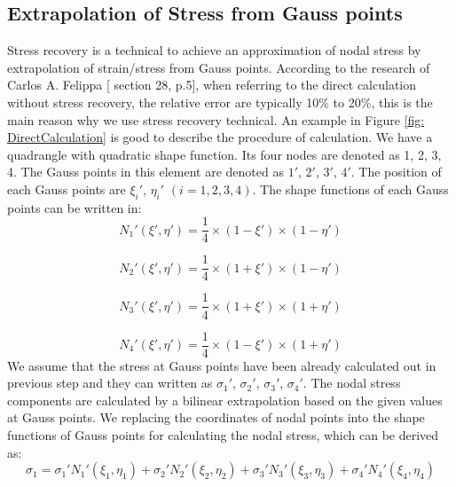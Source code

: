 \subsection{Extrapolation of Stress from Gauss points}
Stress recovery is a technical to achieve an approximation of nodal stress by extrapolation of strain/stress from Gauss points. According to the research of Carlos A. Felippa [\cite{Felippa} section 28, p.5],  when referring to the direct calculation without stress recovery, the relative error are typically 10\% to 20\%, this is the main reason why we use stress recovery technical. An example in Figure \ref{fig: DirectCalculation} is good to describe the procedure of calculation. We have a quadrangle with quadratic shape function. Its four nodes are denoted as 1, 2, 3, 4. The Gauss points in this element are denoted as $1'$, $2'$, $3'$, $4'$. The position of each Gauss points are ${\xi_i}'$, ${\eta_i}'$ $\left(i = 1, 2, 3, 4\right)$. The shape functions of each Gauss points can be written in: 
\begin{equation}
{N_1}' \left(\xi',\eta'\right) = \frac{1}{4}\times\left(1 - {\xi}'\right) \times \left(1 - {\eta}' \right) 
\end{equation}  

\begin{equation}
{N_2}'\left(\xi',\eta'\right) = \frac{1}{4}\times\left(1 + {\xi}'\right) \times \left(1 - {\eta}' \right) 
\end{equation}  

\begin{equation}
{N_3}'\left(\xi',\eta'\right) = \frac{1}{4}\times\left(1 + {\xi}'\right) \times \left(1 + {\eta}' \right) 
\end{equation}  

\begin{equation}
{N_4}' \left(\xi',\eta'\right) = \frac{1}{4}\times\left(1 - {\xi}'\right) \times \left(1 + {\eta}' \right) 
\end{equation}
We assume that the stress at Gauss points have been already calculated out in previous step and they can written as ${\sigma_1}'$, ${\sigma_2}'$, ${\sigma_3}'$, ${\sigma_4}'$. The nodal stress components are calculated by a bilinear extrapolation based on the given values at Gauss points. We replacing the coordinates of nodal points into the shape functions of Gauss points for calculating the nodal stress, which can be derived as:   
\begin{equation}
\sigma_1 = {\sigma_1}' {N_1}'\left(\xi_1, \eta_1\right) + {\sigma_2}' {N_2}'\left(\xi_2, \eta_2\right) + {\sigma_3}' {N_3}'\left(\xi_3, \eta_3\right) + {\sigma_4}' {N_4}' \left(\xi_4, \eta_4\right)
\end{equation}

